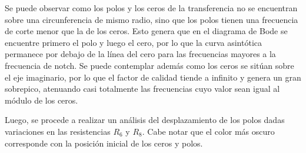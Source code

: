 Se puede observar como los polos y los ceros de la transferencia no se encuentran sobre una circunferencia de mismo radio, sino que los polos tienen una frecuencia de corte menor que la de los ceros. Esto genera que en el diagrama de Bode se encuentre primero el polo y luego el cero, por lo que la curva asintótica permanece por debajo de la línea del cero para las frecuencias mayores a la frecuencia de notch. Se puede contemplar además como los ceros se sitúan sobre el eje imaginario, por lo que el factor de calidad tiende a infinito y genera un gran sobrepico, atenuando casi totalmente las frecuencias cuyo valor sean igual al módulo de los ceros.

Luego, se procede a realizar un análisis del desplazamiento de los polos dadas variaciones en las resistencias $R_6$ y $R_8$. Cabe notar que el color más oscuro corresponde con la posición inicial de los ceros y polos.

